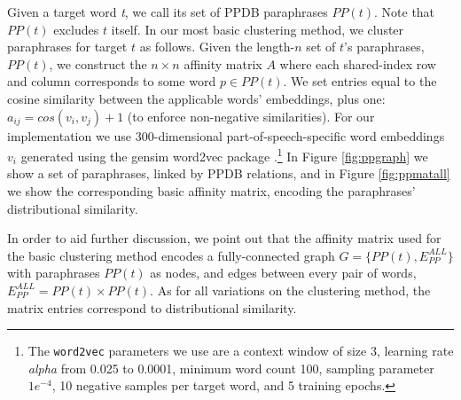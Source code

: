 \documentclass[11pt]{article}
\begin{document}
Given a target word \textit{t}, we call its set of PPDB paraphrases $PP(t)$. Note that $PP(t)$ excludes $t$ itself. In our most basic clustering method, we cluster paraphrases for target $t$ as follows. Given the length-$n$ set of $t$'s paraphrases, $PP(t)$, we construct the $n \times n$ affinity matrix $A$ where each shared-index row and column corresponds to some word $p \in PP(t)$. We set entries equal to the cosine similarity between the applicable words' embeddings, plus one: $a_{ij} = cos(v_i,v_j) + 1$ (to enforce non-negative similarities). For our implementation we use 300-dimensional part-of-speech-specific word embeddings $v_i$ generated using the gensim word2vec package \cite{mikolov2013distributed,mikolov2013efficient,ismu:884893}.\footnote{The \texttt{word2vec} parameters we use are a context window of size 3, learning rate \textit{alpha} from 0.025 to 0.0001, minimum word count 100, sampling parameter $1e^{-4}$, 10 negative samples per target word, and 5 training epochs.} In Figure \ref{fig:ppgraph} we show a set of paraphrases, linked by PPDB relations, and in Figure \ref{fig:ppmatall} we show the corresponding basic affinity matrix, encoding the paraphrases' distributional similarity.

In order to aid further discussion, we point out that the affinity matrix used for the basic clustering method encodes a fully-connected graph $G = \{PP(t), E_{PP}^{ALL}\}$ with paraphrases $PP(t)$ as nodes, and edges between every pair of words, $E_{PP}^{ALL} = PP(t) \times PP(t)$. As for all variations on the clustering method, the matrix entries correspond to distributional similarity.
\end{document}
